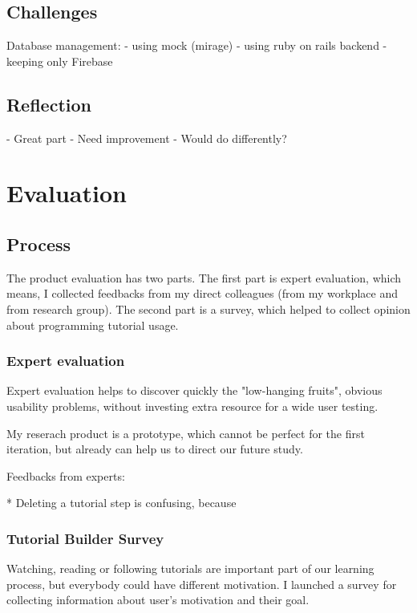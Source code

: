\documentclass[12pt, a4paper, oneside, openright, medskipamount]{report}
\begin{document}
\section{Challenges}

Database management:
- using mock (mirage)
- using ruby on rails backend
- keeping only Firebase


\section{Reflection}

- Great part
- Need improvement
- Would do differently?

\chapter{Evaluation}

\section{Process}

The product evaluation has two parts. The first part is expert evaluation, which means, I collected feedbacks from my direct colleagues (from my workplace and from research group). The second part is a survey, which helped to collect opinion about programming tutorial usage.

\subsection{Expert evaluation}

Expert evaluation helps to discover quickly the "low-hanging fruits", obvious usability problems, without investing extra resource for a wide user testing.

My reserach product is a prototype, which cannot be perfect for the first iteration, but already can help us to direct our future study.

Feedbacks from experts:

* Deleting a tutorial step is confusing, because

\subsection{Tutorial Builder Survey}

Watching, reading or following tutorials are important part of our learning process, but everybody could have different motivation. I launched a survey for collecting information about user's motivation and their goal.
\end{document}
